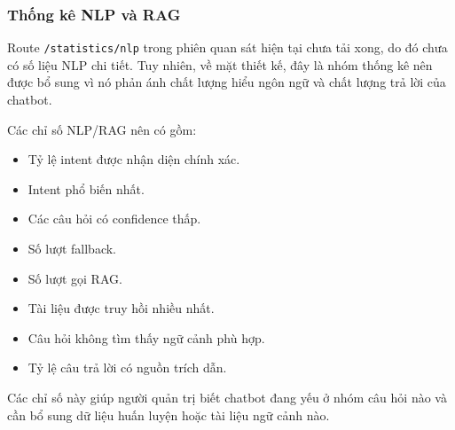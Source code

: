 \subsubsection{Thống kê NLP và RAG}

Route \texttt{/statistics/nlp} trong phiên quan sát hiện tại chưa tải xong, do đó chưa có số liệu NLP chi tiết. Tuy nhiên, về mặt thiết kế, đây là nhóm thống kê nên được bổ sung vì nó phản ánh chất lượng hiểu ngôn ngữ và chất lượng trả lời của chatbot.

Các chỉ số NLP/RAG nên có gồm:

\begin{itemize}
    \item Tỷ lệ intent được nhận diện chính xác.
    \item Intent phổ biến nhất.
    \item Các câu hỏi có confidence thấp.
    \item Số lượt fallback.
    \item Số lượt gọi RAG.
    \item Tài liệu được truy hồi nhiều nhất.
    \item Câu hỏi không tìm thấy ngữ cảnh phù hợp.
    \item Tỷ lệ câu trả lời có nguồn trích dẫn.
\end{itemize}

Các chỉ số này giúp người quản trị biết chatbot đang yếu ở nhóm câu hỏi nào và cần bổ sung dữ liệu huấn luyện hoặc tài liệu ngữ cảnh nào.
